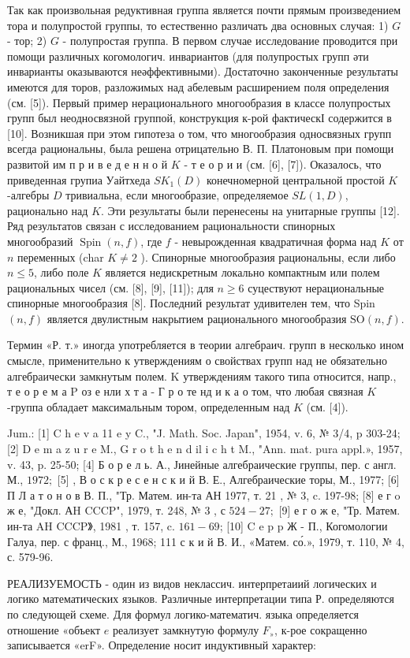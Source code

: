 \documentclass[10pt]{article}
\begin{document}
Так как произвольная редуктивная группа является почти прямым произведением тора и полупростой группы, то естественно различать два основных случая: 1) $G$ - тор; 2) $G$ - полупростая группа. В первом случае исследование проводится при помощи различных когомологич. инвариантов (для полупростых групп әти инварианты оказываются неәффективными). Достаточно законченные результаты имеются для торов, разложимых над абелевым расширением поля определения (см. [5]). Первый пример нерационального многообразия в классе полупростых групп был неодносвязной группой, конструкция к-рой фактическІ содержится в [10]. Возникшая при этом гипотеза о том, что многообразия односвязных групп всегда рациональны, была решена отрицательно В. П. Платоновым при помощи развитой им п р и в е д е н н о й $K$ - т е о р и и (см. [6], [7]). Оказалось, что приведенная групиа Уайтхеда $S K_{1}(D)$ конечномерной центральной простой $K$-алгебры $D$ тривиальна, если многообразие, определяемое $S L(1, D)$, рационально над $K$. Эти результаты были перенесены на унитарные группы [12]. Ряд результатов связан с исследованием рациональности спинорных многообразий $\operatorname{Spin}(n, f)$, где $f$ - невырожденная квадратичная форма над $K$ от $n$ переменных (char $K \neq 2$ ). Спинорные многообразия рациональны, если либо $n \leqslant 5$, либо поле $K$ является недискретным локально компактным или полем рациональных чисел (см. [8], [9], [11]); для $n \geqslant 6$ суцествуют нерациональные спинорные многообразия [8]. Последний результат удивителен тем, что Spin $(n, f)$ является двулистным накрытием рационального многообразия $\mathrm{SO}(n, f)$.



Термин «Р. т.» иногда употребляется в теории алгебраич. групп в несколько ином смысле, применительно к утверждениям о свойствах групп над не обязательно алгебраически замкнутым полем. $\mathrm{K}$ утверждениям такого типа относится, напр., т е о р е м а $\mathrm{P}$ оз е нли х т а - Г р о те нд и к а о том, что любая связная $K$-группа обладает максимальным тором, определенным над $K$ (см. [4]).



Jum.: [1] C h e v a 11 e y C., "J. Math. Soc. Japan", 1954, v. 6, № 3/4, p 303-24; [2] D e m a z u r e M., G r o t h e n d il i c h t M., "Ann. mat. pura appl.», 1957, v. 43, p. 25-50; [4] Б о р е л ь. А., Јинейные алгебраические группы, пер. с англ. М., $1972 ;$ [5] , В о с к р е с е н с к и й В. Е., Алгебраические торы, М., 1977; [6] П Л а т о н о в В. П., "Тр. Матем. ин-та АН 1977, т. 21 , № 3, c. 197-98; [8] е г o ж е, "Докл. АH CCCP", 1979, т. 248, № 3 , с $524-27 ;$ [9] е г о ж е, "Тр. Матем. ин-та AH CCCP》, 1981 , т. 157, c. $161-69$; [10] C e p p Ж - П., Когомологии Галуа, пер. с франц., М., 1968; 111 с к и й В. И., «Матем. со́.», 1979, т. 110, № 4, с. 579-96.



РЕАЛИЗУЕМОСТЬ - один из видов неклассич. интерпретаиий логических и логико математических языков. Различные интерпретации типа Р. определяются по следующей схеме. Для формул логико-математич. языка определяется отношение «объект $e$ реализует замкнутую формулу $F_{»}$, к-рое сокращенно записывается «erF». Определение носит индуктивный характер:
\end{document}
